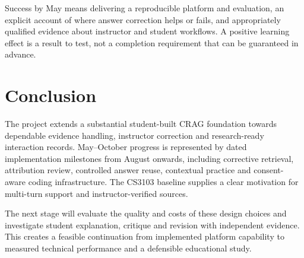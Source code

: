 \documentclass[11pt,a4paper]{article}
\begin{document}
Success by May means delivering a reproducible platform and evaluation, an explicit account of where answer correction helps or fails, and appropriately qualified evidence about instructor and student workflows. A positive learning effect is a result to test, not a completion requirement that can be guaranteed in advance.

\section{Conclusion}
The project extends a substantial student-built CRAG foundation towards dependable evidence handling, instructor correction and research-ready interaction records. May--October progress is represented by dated implementation milestones from August onwards, including corrective retrieval, attribution review, controlled answer reuse, contextual practice and consent-aware coding infrastructure. The CS3103 baseline supplies a clear motivation for multi-turn support and instructor-verified sources.

The next stage will evaluate the quality and costs of these design choices and investigate student explanation, critique and revision with independent evidence. This creates a feasible continuation from implemented platform capability to measured technical performance and a defensible educational study.
\end{document}
